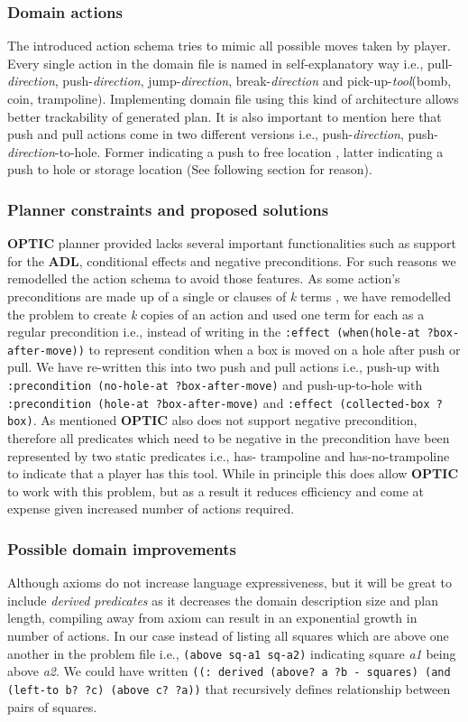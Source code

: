 \documentclass[letterpaper]{article} %
\begin{document}
\subsubsection{Domain actions}
The introduced action schema tries to mimic all possible moves taken by player. Every single action in the domain file is named in self-explanatory way i.e., pull-\emph{direction}, push-\emph{direction}, jump-\emph{direction}, break-\emph{direction} and pick-up-\emph{tool}(bomb, coin, trampoline). Implementing domain file using this kind of architecture allows better trackability of generated plan. It is also important to mention here that push and pull actions come in two different versions i.e., push-\emph{direction}, push-\emph{direction}-to-hole. Former indicating a push to free location , latter indicating a push to hole or storage location (See following section for reason).

\subsubsection{Planner constraints and proposed solutions}
\textbf{OPTIC} planner provided lacks several important functionalities such as support for the \textbf{ADL}, conditional effects and negative preconditions. For such reasons we remodelled the action schema to avoid those features. As some action’s preconditions are made up of a single or clauses of \emph{k} terms \cite{haslum_2019}, we have remodelled the problem to create \emph{k} copies of an action and used one term for each as a regular precondition i.e., instead of writing in the \texttt{:effect (when(hole-at ?box-after-move))} to represent condition when a box is moved on a hole after push or pull. We have re-written this into two push and pull actions i.e., push-up with \texttt{:precondition (no-hole-at ?box-after-move)} and push-up-to-hole with \texttt{:precondition (hole-at ?box-after-move)} and \texttt{:effect (collected-box ?box)}. As mentioned \textbf{OPTIC}  also does not support negative precondition, therefore all predicates which need to be negative in the precondition have been represented by two static predicates i.e., has- trampoline and has-no-trampoline to indicate that a player has this tool. While in principle this does allow \textbf{OPTIC} to work with this problem, but as a result it reduces efficiency and come at expense given increased number of actions required.   

\subsubsection{Possible domain improvements}
Although axioms do not increase language expressiveness, but it will be great to include \emph{derived predicates} as it decreases the domain description size and plan length, compiling away from axiom can result in an exponential growth in number of actions. In our case instead of listing all squares which are above one another in the problem file i.e., \texttt{(above sq-a1 sq-a2)} indicating square \emph{a1} being above \emph{a2}. We could have written \texttt{((: derived (above? a ?b - squares) (and (left-to b?  ?c) (above c? ?a))} that recursively defines relationship between pairs of squares.   
\end{document}
